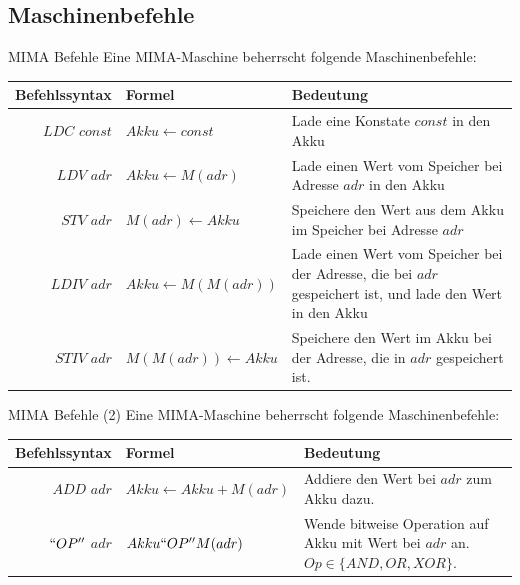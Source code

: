 \documentclass[handout]{beamer}
\begin{document}
\subsection{Maschinenbefehle}

\begin{frame}{MIMA Befehle}
	Eine MIMA-Maschine beherrscht folgende Maschinenbefehle:
	
	\vspace{.5cm}
	
	\begin{tabular}{r | l p{5cm} }
		Befehlssyntax & Formel & Bedeutung\\\hline\hline \ip
		$LDC$ $const$ & $Akku \leftarrow const$ & Lade eine Konstate $const$ in den Akku \\\hline \ip
		$LDV$ $adr$ & $Akku \leftarrow M(adr)$ & Lade einen Wert vom Speicher bei Adresse $adr$ in den Akku\\\hline\ip
		$STV$ $adr$ & $M(adr) \leftarrow Akku$ & Speichere den Wert aus dem Akku im Speicher bei Adresse $adr$\\\hline\ip
		$LDIV$ $adr$ & $Akku \leftarrow M(M(adr))$ & Lade einen Wert vom Speicher bei der Adresse, die bei $adr$ gespeichert ist, und lade den Wert in den Akku\\\hline\ip
		$STIV$ $adr$ & $M(M(adr)) \leftarrow Akku$ & Speichere den Wert im Akku bei der Adresse, die in $adr$ gespeichert ist.
	\end{tabular}
\end{frame}

\begin{frame}{MIMA Befehle (2)}
	Eine MIMA-Maschine beherrscht folgende Maschinenbefehle:
	
	\vspace{.5cm}
	
	\begin{tabular}{r | l p{3cm} }
		Befehlssyntax & Formel & Bedeutung\\\hline\hline \ip
		$ADD$ $adr$ & $Akku \leftarrow Akku + M(adr)$ & Addiere den Wert bei $adr$ zum Akku dazu.\\\hline\ip
		$``OP''$ $adr$ & $Akku ``OP'' M(adr)$ & Wende bitweise Operation auf Akku mit Wert bei $adr$ an. $Op \in \{AND, OR, XOR\}$.
	\end{tabular}
\end{frame}
\end{document}
